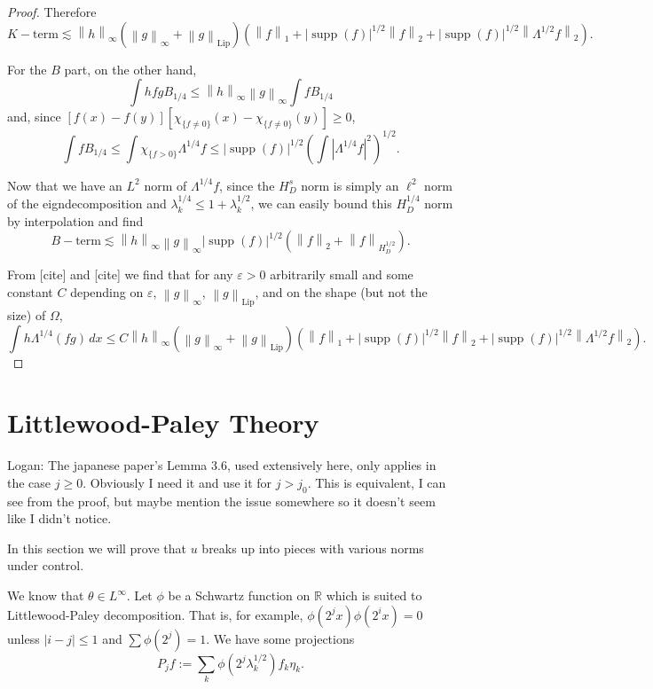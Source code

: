 \documentclass[11pt]{amsart}
\theoremstyle{remark}
\theoremstyle{definition}
\newcommand{\R}{\mathbb{R}}
\newcommand{\eps}{\varepsilon}
\newcommand{\norm}[1]{\left\lVert#1\right\rVert}
\newcommand{\paren}[1]{\left( #1 \right)}
\newcommand{\abs}[1]{\left\lvert #1 \right\rvert}
\DeclareMathOperator{\supp}{supp}
\newcommand{\Lip}{\text{Lip}}
\newcommand{\indic}[1]{\chi_{\{#1\}}}
\newcommand{\eigen}[1]{\eta_{#1}} %
\begin{document}
\begin{proof}
Therefore 
\[ K-\textrm{term} \lesssim \norm{h}_\infty \paren{\norm{g}_\infty+\norm{g}_\Lip} \paren{ \norm{f}_1 + |\supp(f)|^{1/2} \norm{f}_2 + |\supp(f)|^{1/2} \norm{\Lambda^{1/2}f}_2}. \]

For the $B$ part, on the other hand, 
\[ \int h f g B_{1/4} \leq \norm{h}_\infty \norm{g}_\infty \int f B_{1/4} \]
and, since $[f(x)-f(y)][\indic{f\neq0}(x)-\indic{f\neq0}(y)] \geq 0$,
\[ \int f B_{1/4} \leq \int \indic{f>0} \Lambda^{1/4} f \leq |\supp(f)|^{1/2} \paren{\int \abs{\Lambda^{1/4} f}^2}^{1/2}. \]

Now that we have an $L^2$ norm of $\Lambda^{1/4} f$, since the $H^s_D$ norm is simply an $\ell^2$ norm of the eigndecomposition and $\lambda_k^{1/4} \leq 1 + \lambda_k^{1/2}$, we can easily bound this $H^{1/4}_D$ norm by interpolation and find
\[ B-\textrm{term} \lesssim \norm{h}_\infty \norm{g}_\infty |\supp(f)|^{1/2} \paren{\norm{f}_2 + \norm{f}_{H_D^{1/2}}}. \]

From [cite] and [cite] we find that for any $\eps > 0$ arbitrarily small and some constant $C$ depending on $\eps$, $\norm{g}_\infty$, $\norm{g}_\Lip$, and on the shape (but not the size) of $\Omega$,
\[ \int h \Lambda^{1/4} (fg) \,dx \leq C \norm{h}_\infty \paren{\norm{g}_\infty+\norm{g}_\Lip} \paren{ \norm{f}_1 + |\supp(f)|^{1/2} \norm{f}_2 + |\supp(f)|^{1/2} \norm{\Lambda^{1/2}f}_2}. \]
\end{proof}


\section{Littlewood-Paley Theory} \label{sec:littlewood paley}

Logan: The japanese paper's Lemma 3.6, used extensively here, only applies in the case $j \geq 0$. Obviously I need it and use it for $j > j_0$.  This is equivalent, I can see from the proof, but maybe mention the issue somewhere so it doesn't seem like I didn't notice.  

In this section we will prove that $u$ breaks up into pieces with various norms under control.  

We know that $\theta \in L^\infty$.  Let $\phi$ be a Schwartz function on $\R$ which is suited to Littlewood-Paley decomposition.  That is, for example, $\phi(2^j x) \phi(2^i x) = 0$ unless $|i-j|\leq 1$ and $\sum \phi(2^j) = 1$.  We have some projections 
\[ P_j f := \sum_k \phi(2^j \lambda_k^{1/2}) f_k \eigen{k}. \]
\end{document}
